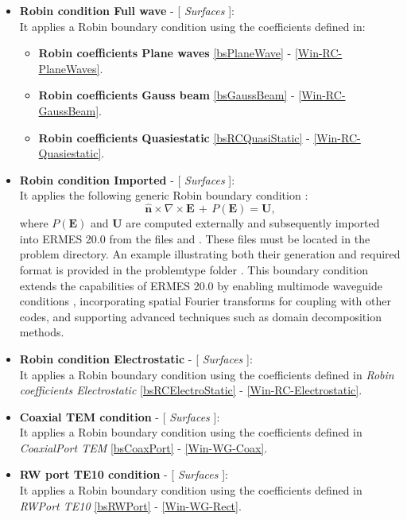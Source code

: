 \begin{itemize}
    \\
	\item \textbf{Robin condition Full wave} - [ \textit{Surfaces} ]:\\
	It applies a Robin boundary condition using the coefficients defined in:	
	\begin{itemize}\itemsep0em 
	    \item \textbf{Robin coefficients Plane waves} \ref{bsPlaneWave} - \ref{Win-RC-PlaneWaves}.
	    \item \textbf{Robin coefficients Gauss beam} \ref{bsGaussBeam} - \ref{Win-RC-GaussBeam}.
	    \item \textbf{Robin coefficients Quasiestatic} \ref{bsRCQuasiStatic} - \ref{Win-RC-Quasiestatic}.\\
    \end{itemize}
    \item \textbf{Robin condition Imported} - [ \textit{Surfaces} ]:\\
    It applies the following generic Robin boundary condition \cite{JinAntArr}:
    \begin{equation}\label{IRBC}
    	\mathbf{\hat{n}}\times\nabla\times\mathbf{E}\, + \,P(\mathbf{E}) = \mathbf{U},
    \end{equation}
    where $P(\mathbf{E})$ and $\mathbf{U}$ are computed externally and subsequently imported into ERMES 20.0 from the files  and . These files must be located in the problem directory. An example illustrating both their generation and required format is provided in the problemtype folder . This boundary condition extends the capabilities of ERMES 20.0 by enabling multimode waveguide conditions \cite{JinAntArr}, incorporating spatial Fourier transforms for coupling with other codes, and supporting advanced techniques such as domain decomposition methods.
    \\
	\item \textbf{Robin condition Electrostatic} - [ \textit{Surfaces} ]:\\
	It applies a Robin boundary condition using the coefficients defined in \textit{Robin coefficients Electrostatic} \ref{bsRCElectroStatic} - \ref{Win-RC-Electrostatic}.
    \\
	\item \textbf{Coaxial TEM condition} - [ \textit{Surfaces} ]:\\
	It applies a Robin boundary condition using the coefficients defined in \textit{CoaxialPort TEM} \ref{bsCoaxPort} - \ref{Win-WG-Coax}.
	\\
	\item \textbf{RW port TE10 condition} - [ \textit{Surfaces} ]:\\
	It applies a Robin boundary condition using the coefficients defined in \textit{RWPort TE10} \ref{bsRWPort} - \ref{Win-WG-Rect}.
\end{itemize}

